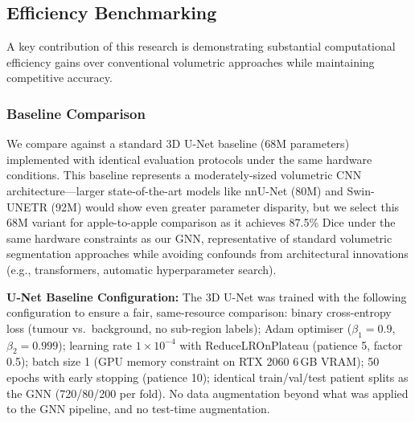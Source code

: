 \subsection{Efficiency Benchmarking}

A key contribution of this research is demonstrating substantial computational efficiency gains over conventional volumetric approaches while maintaining competitive accuracy.

\subsubsection{Baseline Comparison}

We compare against a standard 3D U-Net baseline (68M parameters) implemented with identical evaluation protocols under the same hardware conditions. This baseline represents a moderately-sized volumetric CNN architecture—larger state-of-the-art models like nnU-Net (80M) and Swin-UNETR (92M) would show even greater parameter disparity, but we select this 68M variant for apple-to-apple comparison as it achieves 87.5\% Dice under the same hardware constraints as our GNN, representative of standard volumetric segmentation approaches while avoiding confounds from architectural innovations (e.g., transformers, automatic hyperparameter search).

\textbf{U-Net Baseline Configuration:} The 3D U-Net was trained with the following configuration to ensure a fair, same-resource comparison: binary cross-entropy loss (tumour vs.\ background, no sub-region labels); Adam optimiser ($\beta_1 = 0.9$, $\beta_2 = 0.999$); learning rate $1\times10^{-4}$ with ReduceLROnPlateau (patience 5, factor 0.5); batch size 1 (GPU memory constraint on RTX 2060 6\,GB VRAM); 50 epochs with early stopping (patience 10); identical train/val/test patient splits as the GNN (720/80/200 per fold). No data augmentation beyond what was applied to the GNN pipeline, and no test-time augmentation.

